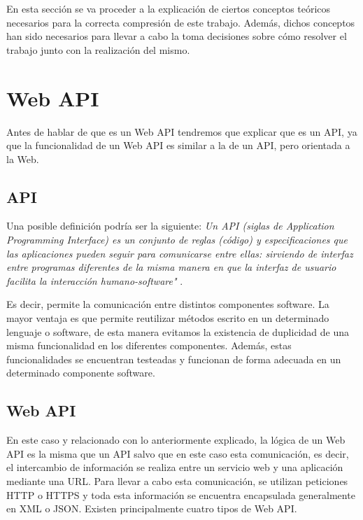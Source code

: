 
En esta sección se va proceder a la explicación de ciertos conceptos teóricos necesarios para la correcta compresión de este trabajo. Además, dichos conceptos han sido necesarios para llevar a cabo la toma decisiones sobre cómo resolver el trabajo junto con la realización del mismo.


\section{Web API}

Antes de hablar de que es un Web API tendremos que explicar que es un API, ya que la funcionalidad de un Web API es similar a la de un API, pero orientada a la Web.

\subsection{API}

Una posible definición podría ser la siguiente: \emph{Un API (siglas de Application Programming Interface) es un conjunto de reglas (código) y especificaciones que las aplicaciones pueden seguir para comunicarse entre ellas: sirviendo de interfaz entre programas diferentes de la misma manera en que la interfaz de usuario facilita la interacción humano-software"} \cite{wiki:api}.





Es decir, permite la comunicación entre distintos componentes software. La mayor ventaja es que permite reutilizar métodos escrito en un determinado lenguaje o software, de esta manera evitamos la existencia de duplicidad de una misma funcionalidad en los diferentes componentes. Además, estas funcionalidades se encuentran testeadas y funcionan de forma adecuada en un determinado componente software.

\subsection{Web API}

En este caso y relacionado con lo anteriormente explicado, la lógica de un Web API es la misma que un API salvo que en este caso esta comunicación, es decir, el intercambio de información se realiza entre un servicio web y una aplicación mediante una URL. Para llevar a cabo esta comunicación, se utilizan peticiones HTTP o HTTPS y toda esta información se encuentra encapsulada generalmente en XML o JSON.
Existen principalmente cuatro tipos de Web API.

